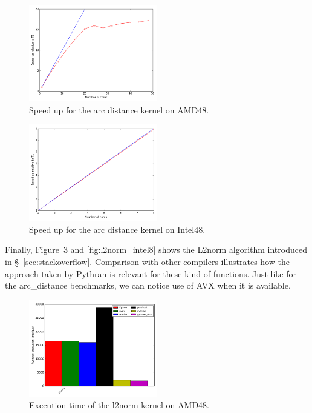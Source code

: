 \documentclass[10pt, preprint]{sigplanconf}
\begin{document}
\begin{figure}[t]
\centering
\includegraphics[width=0.5\textwidth]{arc_distance_amd48.png}
\caption{Speed up for the arc distance kernel on AMD48.}
\label{fig:arc_distance}
\end{figure}

\begin{figure}[t]
\centering
\includegraphics[width=0.5\textwidth]{arc_distance_intel8.png}
\caption{Speed up for the arc distance kernel on Intel48.}
\label{fig:arc_distance_intel8}
\end{figure}

Finally, Figure~\ref{fig:l2norme} and \ref{fig:l2norm_intel8} shows the L2norm algorithm introduced in
\S~\ref{sec:stackoverflow}. Comparison with other compilers illustrates how the
approach taken by Pythran is relevant for these kind of functions. Just like for
the arc\_distance benchmarks, we can notice use of AVX when it is available.

\begin{figure}[t]
\centering
\includegraphics[width=0.5\textwidth]{l2norm_amd48.png}
\caption{Execution time of the l2norm kernel on AMD48.}
\label{fig:l2norme}
\end{figure}
\end{document}
